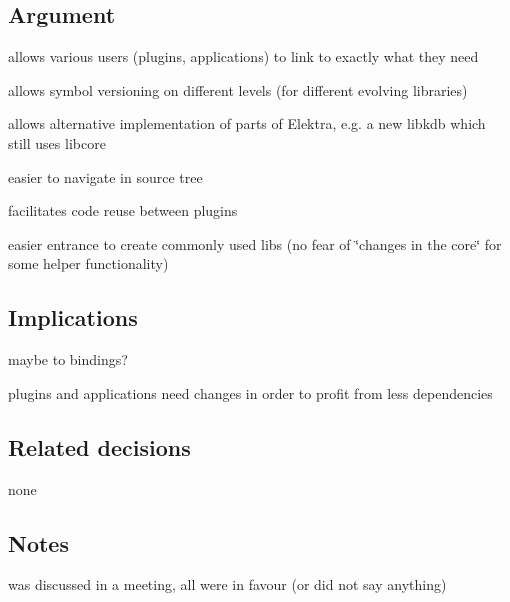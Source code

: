 \subsection*{Argument}


\begin{DoxyItemize}
\item allows various users (plugins, applications) to link to exactly what they need
\item allows symbol versioning on different levels (for different evolving libraries)
\item allows alternative implementation of parts of Elektra, e.\+g. a new libkdb which still uses libcore
\item easier to navigate in source tree
\item facilitates code reuse between plugins
\item easier entrance to create commonly used libs (no fear of \char`\"{}changes in the core\char`\"{} for some helper functionality)
\end{DoxyItemize}

\subsection*{Implications}


\begin{DoxyItemize}
\item maybe to bindings?
\item plugins and applications need changes in order to profit from less dependencies
\end{DoxyItemize}

\subsection*{Related decisions}


\begin{DoxyItemize}
\item none
\end{DoxyItemize}

\subsection*{Notes}


\begin{DoxyItemize}
\item was discussed in a meeting, all were in favour (or did not say anything)
\end{DoxyItemize}

